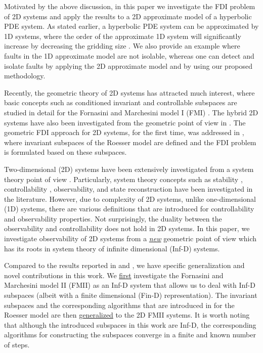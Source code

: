 \documentclass[journal,12pt,draftcls,onecolumn]{IEEEtran}
\begin{document}
Motivated by the above discussion, in this paper we investigate the FDI problem of 2D systems and apply the results to a 2D approximate model of a hyperbolic PDE system. As stated earlier, a hyperbolic PDE system can be approximated by  1D systems, where the order of the approximate 1D system will significantly increase by decreasing the gridding size \cite{Christofer_Hyperbolic}. We also provide an example where faults in the 1D approximate model are not isolable, whereas one can detect and isolate  faults by applying the 2D approximate model and by using our proposed methodology.


Recently, the geometric theory of 2D  systems has attracted much interest, where basic concepts such as conditioned invariant and controllable subspaces are studied in detail for the Fornasini and Marchesini model I (FMI) \cite{ ntogramatzidis2012GeometryArticle, ntogramatzidis2012Siam}. The hybrid 2D systems have also been investigated from the geometric point of view in \cite{Valcher2013}. The geometric FDI approach for 2D systems, for the first time, was addressed in \cite{ACC2013}, where invariant subspaces of the Roesser model are defined and the FDI problem is formulated based on these subspaces.

Two-dimensional (2D) systems have  been extensively investigated from a system theory point of view \cite{Kaczorek_Book, 2DRef, Stability2D2013, FMinBook}. Particularly, system theory concepts such as stability \cite{2DLyapunov, Stability2D2013}, controllability \cite{Controlability2D}, observability\cite{Valcher2013}, and state reconstruction \cite{2DKalman} have been investigated in the literature. However, due to complexity of 2D systems, unlike one-dimensional (1D) systems,  there are various definitions that are introduced for controllability and observability properties. Not surprisingly, the duality between the observability and controllability does not hold in 2D systems.
In this paper, we investigate observability of 2D systems from a \underline{{\it new}} geometric point of view  which has its roots in system theory of infinite dimensional (Inf-D) systems.

Compared to the results reported in \cite{ACC2013} and \cite{ACC2014}, we have specific generalization and novel contributions in this work. We \underline{first} investigate the Fornasini and Marchesini model II (FMII) as an Inf-D system that allows us to deal with Inf-D subspaces (albeit with a finite dimensional (Fin-D) representation). The invariant subspaces and the corresponding algorithms  that are introduced in \cite{ACC2013} for the Roesser model are then \underline{generalized} to the 2D FMII systems. It is worth noting that although the introduced subspaces in this work are Inf-D, the corresponding algorithms for constructing the subspaces converge in a finite and known number of steps.
\end{document}
